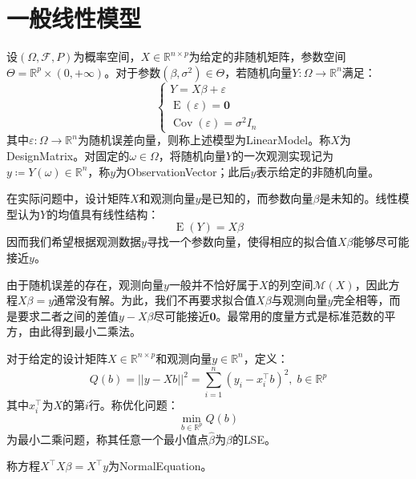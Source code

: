 \section{一般线性模型}
\begin{definition}\label{model:LinearModel}
	设$(\Omega,\mathscr{F},P)$为概率空间，$X\in\mathbb{R}^{n\times p}$为给定的非随机矩阵，参数空间$\Theta=\mathbb{R}^p\times(0,+\infty)$。对于参数$(\beta,\sigma^2)\in\Theta$，若随机向量$Y:\Omega\to\mathbb{R}^n$满足：
	\begin{equation*}
		\begin{cases}
			Y=X\beta+\varepsilon \\
			\operatorname{E}(\varepsilon)=\mathbf{0} \\
			\operatorname{Cov}(\varepsilon)=\sigma^2I_n
		\end{cases}
	\end{equation*}
	其中$\varepsilon:\Omega\to\mathbb{R}^n$为随机误差向量，则称上述模型为\gls{LinearModel}。称$X$为\gls{DesignMatrix}。对固定的$\omega\in\Omega$，将随机向量$Y$的一次观测实现记为$y\coloneq Y(\omega)\in\mathbb{R}^n$，称$y$为\gls{ObservationVector}；此后$y$表示给定的非随机向量。
\end{definition}
在实际问题中，设计矩阵$X$和观测向量$y$是已知的，而参数向量$\beta$是未知的。线性模型认为$Y$的均值具有线性结构：
\begin{equation*}
	\operatorname{E}(Y)=X\beta
\end{equation*}
因而我们希望根据观测数据$y$寻找一个参数向量，使得相应的拟合值$X\beta$能够尽可能接近$y$。\par
由于随机误差的存在，观测向量$y$一般并不恰好属于$X$的列空间$\mathcal{M}(X)$，因此方程$X\beta=y$通常没有解。为此，我们不再要求拟合值$X\beta$与观测向量$y$完全相等，而是要求二者之间的差值$y-X\beta$尽可能接近$\mathbf{0}$。最常用的度量方式是标准范数的平方，由此得到最小二乘法。
\begin{definition}
	对于给定的设计矩阵$X\in\mathbb{R}^{n\times p}$和观测向量$y\in\mathbb{R}^n$，定义：
	\begin{equation*}
		Q(b)=||y-Xb||^2=\sum_{i=1}^n\left(y_i-x_i^{\top}b\right)^2,\; b\in\mathbb{R}^p
	\end{equation*}
	其中$x_i^{\top}$为$X$的第$i$行。称优化问题：
	\begin{equation*}
		\min_{b\in\mathbb{R}^p}Q(b)
	\end{equation*}
	为最小二乘问题，称其任意一个最小值点$\hat{\beta}$为$\beta$的\gls{LSE}。
\end{definition}
\begin{definition}
	称方程$X^{\top}X\beta=X^{\top}y$为\gls{NormalEquation}。
\end{definition}
